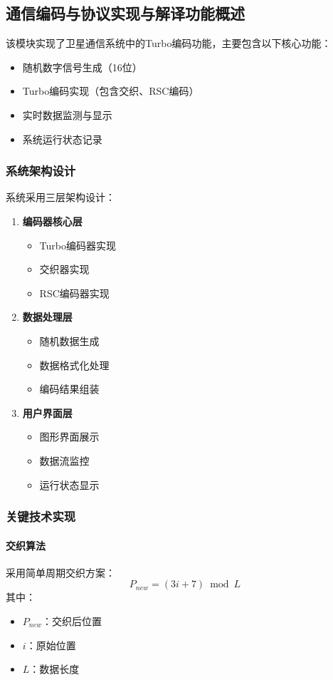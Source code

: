 \documentclass[12pt]{article}
\begin{document}
\subsection{通信编码与协议实现与解译功能概述}
该模块实现了卫星通信系统中的Turbo编码功能，主要包含以下核心功能：
\begin{itemize}
    \item 随机数字信号生成（16位）
    \item Turbo编码实现（包含交织、RSC编码）
    \item 实时数据监测与显示
    \item 系统运行状态记录
\end{itemize}

\subsubsection{系统架构设计}
系统采用三层架构设计：
\begin{enumerate}
    \item \textbf{编码器核心层}
    \begin{itemize}
        \item Turbo编码器实现
        \item 交织器实现
        \item RSC编码器实现
    \end{itemize}
    
    \item \textbf{数据处理层}
    \begin{itemize}
        \item 随机数据生成
        \item 数据格式化处理
        \item 编码结果组装
    \end{itemize}
    
    \item \textbf{用户界面层}
    \begin{itemize}
        \item 图形界面展示
        \item 数据流监控
        \item 运行状态显示
    \end{itemize}
\end{enumerate}

\subsubsection{关键技术实现}
\paragraph{交织算法}
采用简单周期交织方案：
\begin{equation}
P_{new} = (3i + 7) \bmod L
\end{equation}
其中：
\begin{itemize}
    \item $P_{new}$：交织后位置
    \item $i$：原始位置
    \item $L$：数据长度
\end{itemize}
\end{document}
